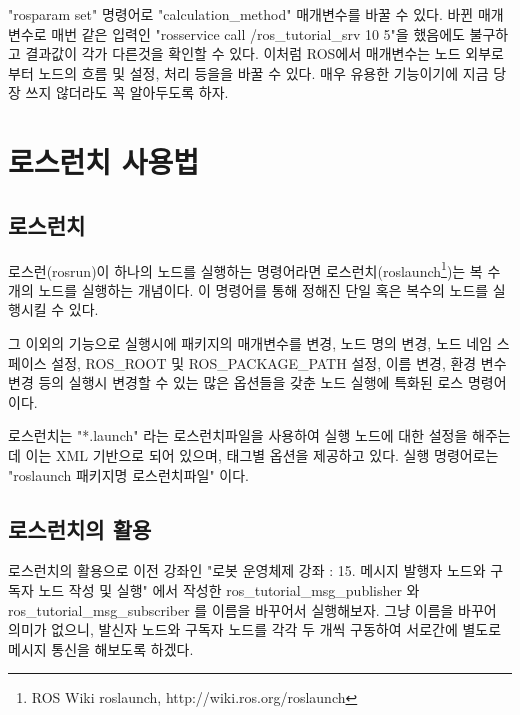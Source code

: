 "rosparam set" 명령어로 "calculation\_method" 매개변수를 바꿀 수 있다. 바뀐 매개변수로 매번 같은 입력인 "rosservice call /ros\_tutorial\_srv 10 5"을 했음에도 불구하고 결과값이 각가 다른것을 확인할 수 있다.  이처럼 ROS에서 매개변수는 노드 외부로부터 노드의 흐름 및 설정, 처리 등을을 바꿀 수 있다. 매우 유용한 기능이기에 지금 당장 쓰지 않더라도 꼭 알아두도록 하자.


\section{로스런치 사용법}

\subsection{로스런치}

\begin{definition}[roslaunch]
로스런(rosrun)이 하나의 노드를 실행하는 명령어라면 로스런치(roslaunch\footnote{ROS Wiki roslaunch, http://wiki.ros.org/roslaunch})는 복 수개의 노드를 실행하는 개념이다. 이 명령어를 통해 정해진 단일 혹은 복수의 노드를 실행시킬 수 있다. 

그 이외의 기능으로 실행시에 패키지의 매개변수를 변경, 노드 명의 변경, 노드 네임 스페이스 설정, ROS\_ROOT 및 ROS\_PACKAGE\_PATH 설정, 이름 변경, 환경 변수 변경 등의 실행시 변경할 수 있는 많은 옵션들을 갖춘 노드 실행에 특화된 로스 명령어이다. 

로스런치는 "*.launch" 라는 로스런치파일을 사용하여 실행 노드에 대한 설정을 해주는데 이는 XML 기반으로 되어 있으며, 태그별 옵션을 제공하고 있다. 실행 명령어로는 "roslaunch 패키지명 로스런치파일" 이다.
\end{definition}

\subsection{로스런치의 활용}

로스런치의 활용으로 이전 강좌인 "로봇 운영체제 강좌 : 15. 메시지 발행자 노드와 구독자 노드 작성 및 실행" 에서 작성한 ros\_tutorial\_msg\_publisher 와  ros\_tutorial\_msg\_subscriber 를 이름을 바꾸어서 실행해보자. 그냥 이름을 바꾸어 의미가 없으니, 발신자 노드와 구독자 노드를 각각 두 개씩 구동하여 서로간에 별도로 메시지 통신을 해보도록 하겠다.

